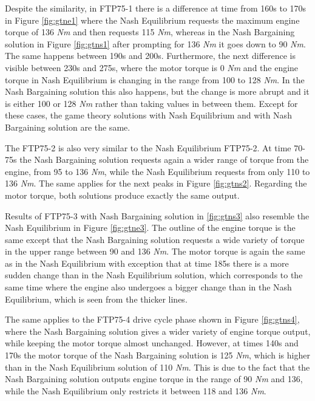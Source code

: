 Despite the similarity, in FTP75-1 there is a difference at time from 160s to 170s in Figure \ref{fig:gtne1} where the Nash Equilibrium requests the maximum engine torque of 136 \textit{Nm} and then requests 115 \textit{Nm}, whereas in the Nash Bargaining solution in Figure \ref{fig:gtns1} after prompting for 136 \textit{Nm} it goes down to 90 \textit{Nm}. The same happens between 190s and 200s. Furthermore, the next difference is visible between 230s and 275s, where the motor torque is 0 \textit{Nm} and the engine torque in Nash Equilibrium is changing in the range from 100 to 128 \textit{Nm}. In the Nash Bargaining solution this also happens, but the change is more abrupt and it is either 100 or 128 \textit{Nm} rather than taking values in between them. Except for these cases, the game theory solutions with Nash Equilibrium and with Nash Bargaining solution are the same.

The FTP75-2 is also very similar to the Nash Equilibrium FTP75-2. At time 70-75s the Nash Bargaining solution requests again a wider range of torque from the engine, from 95 to 136 \textit{Nm}, while the Nash Equilibrium requests from only 110 to 136 \textit{Nm}. The same applies for the next peaks in Figure \ref{fig:gtns2}. Regarding the motor torque, both solutions produce exactly the same output.

Results of FTP75-3 with Nash Bargaining solution in \ref{fig:gtns3} also resemble the Nash Equilibrium in Figure \ref{fig:gtne3}. The outline of the engine torque is the same except that the Nash Bargaining solution requests a wide variety of torque in the upper range between 90 and 136 \textit{Nm}. The motor torque is again the same as in the Nash Equilibrium with exception that at time 185s there is a more sudden change than in the Nash Equilibrium solution, which corresponds to the same time where the engine also undergoes a bigger change than in the Nash Equilibrium, which is seen from the thicker lines.

The same applies to the FTP75-4 drive cycle phase shown in Figure \ref{fig:gtns4}, where the Nash Bargaining solution gives a wider variety of engine torque output, while keeping the motor torque almost unchanged. However, at times 140s and 170s the motor torque of the Nash Bargaining solution is 125 \textit{Nm}, which is higher than in the Nash Equilibrium solution of 110 \textit{Nm}. This is due to the fact that the Nash Bargaining solution outputs engine torque in the range of 90 \textit{Nm} and 136, while the Nash Equilibrium only restricts it between 118 and 136 \textit{Nm}.

